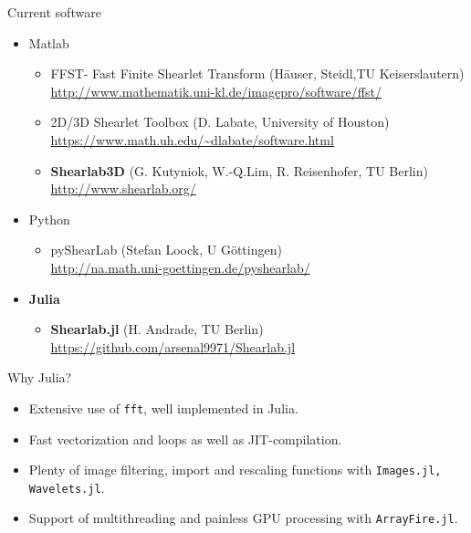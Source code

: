 \begin{frame}{Current software}
\begin{itemize}
\item{Matlab}
\begin{itemize}
	\item FFST- Fast Finite Shearlet Transform (H\"auser, Steidl,TU Keiserslautern)\\ \url{http://www.mathematik.uni-kl.de/imagepro/software/ffst/}
	\item 2D/3D Shearlet Toolbox (D. Labate, University of Houston)\\ \url{https://www.math.uh.edu/~dlabate/software.html}
	\item \textbf{Shearlab3D} (G. Kutyniok, W.-Q.Lim, R. Reisenhofer, TU Berlin)\\\url{http://www.shearlab.org/}
\end{itemize}

\item{Python}
\begin{itemize}
	\item pyShearLab (Stefan Loock, U G\"ottingen) \\ \url{http://na.math.uni-goettingen.de/pyshearlab/}
\end{itemize}

\item{\textbf{Julia}}
\begin{itemize}
\item \textbf{Shearlab.jl} (H. Andrade, TU Berlin) \\ \url{https://github.com/arsenal9971/Shearlab.jl}
\end{itemize}
\end{itemize}
\end{frame}

\begin{frame}{Why Julia?}
\begin{itemize}
\item Extensive use of \lstinline[language=julia]{fft}, well implemented in Julia.

\bigskip

\item Fast vectorization and loops as well as JIT-compilation.

\bigskip

\item Plenty of image filtering, import and rescaling functions with  \lstinline[language=julia]{Images.jl, Wavelets.jl}.

\bigskip

\item Support of multithreading and painless GPU processing with  \lstinline[language=julia]{ArrayFire.jl}.
\end{itemize}
\end{frame}

